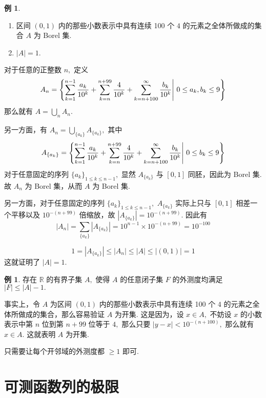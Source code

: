\documentclass[12pt, a4paper, oneside]{book}
\numberwithin{figure}{section}
\theoremstyle{definition}
\newtheorem{example}[theorem]{例}
\begin{document}
\begin{example}
    \begin{enumerate}[label=\alph*)]
        \item 区间 $(0,1)$ 内的那些小数表示中具有连续 100 个 $4$ 的元素之全体所做成的集合 $A$ 为 Borel 集.
        \item $|A|=1.$
    \end{enumerate}
\end{example}

对于任意的正整数 $n,$ 定义 
\begin{equation}
    A_n=\left\{\sum_{k=1}^{n-1}{a_k\over 10^k}+\sum_{k=n}^{n+99} {4\over 10^k}+\sum_{k=n+100}^\infty {b_k\over 10^k}\Bigg|\ 0\leq a_k,b_k\leq 9\right\}
\end{equation}
那么就有 $A=\bigcup_n A_n.$ 

另一方面，有
$A_n=\bigcup_{\{a_k\}}A_{\{a_k\}},$ 其中 
\begin{equation}
    A_{\{a_k\}}=\left\{\sum_{k=1}^{n-1}{a_k\over 10^k}+\sum_{k=n}^{n+99} {4\over 10^k}+\sum_{k=n+100}^\infty {b_k\over 10^k}\Bigg|\ 0\leq b_k\leq 9\right\}
\end{equation}
对于任意固定的序列 $\{a_k\}_{1\leq k\leq n-1},$ 显然 $A_{\{a_k\}}$ 与 $[0,1]$ 同胚，因此为 Borel 集. 故 $A_n$ 为 Borel 集，从而 $A$ 为 Borel 集.

另一方面，对于任意固定的序列 $\{a_k\}_{1\leq k\leq n-1},$ $A_{\{a_k\}}$ 实际上只与 $[0,1]$ 相差一个平移以及 $10^{-(n+99)}$ 倍缩放，故 $|A_{\{a_k\}}|=10^{-(n+99)}.$ 因此有
\begin{equation}
    |A_n|=\sum_{\{a_k\}}|A_{\{a_k\}}|=10^{n-1}\times 10^{-(n+99)}=10^{-100}
\end{equation}


\begin{equation}
    1=|A_{\{a_k\}}|\leq |A_n|\leq |A|\leq |(0,1)|=1
\end{equation}
这就证明了 $|A|=1.$

\begin{example}
    存在 $\mathbb R$ 的有界子集 $A,$ 使得 $A$ 的任意闭子集 $F$ 的外测度均满足 $|F|\leq |A|-1.$
\end{example}

事实上，令 $A$ 为区间 $(0,1)$ 内的那些小数表示中具有连续 100 个 $4$ 的元素之全体所做成的集合，那么容易验证 $A$ 为开集. 这是因为，设 $x\in A,$ 不妨设 $x$ 的小数表示中第 $n$ 位到第 $n+99$ 位等于 $4,$ 那么只要 $|y-x|<10^{-(n+100)},$ 那么就有 $x\in A.$ 这就表明 $A$ 为开集. 

只需要让每个开邻域的外测度都 $\geq 1$ 即可.

\section{可测函数列的极限}

\nocite{*}


\end{document}
